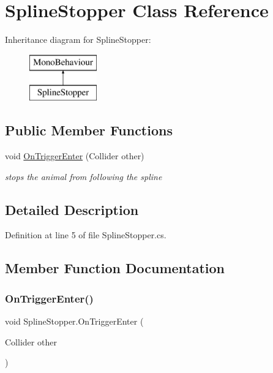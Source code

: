 \hypertarget{class_spline_stopper}{}\section{Spline\+Stopper Class Reference}
\label{class_spline_stopper}
Inheritance diagram for Spline\+Stopper\+:\begin{figure}[H]
\begin{center}
\leavevmode
\includegraphics[height=2.000000cm]{class_spline_stopper}
\end{center}
\end{figure}
\subsection*{Public Member Functions}
\begin{DoxyCompactItemize}
\item 
void \mbox{\hyperlink{class_spline_stopper_aa059cfb2f8f9bbf1fba969314fbbec49}{On\+Trigger\+Enter}} (Collider other)
\begin{DoxyCompactList}\small\item\em stops the animal from following the spline \end{DoxyCompactList}\end{DoxyCompactItemize}


\subsection{Detailed Description}


Definition at line 5 of file Spline\+Stopper.\+cs.



\subsection{Member Function Documentation}
\mbox{\label{class_spline_stopper_aa059cfb2f8f9bbf1fba969314fbbec49}} 
\subsubsection{\texorpdfstring{On\+Trigger\+Enter()}{OnTriggerEnter()}}
{\footnotesize\ttfamily void Spline\+Stopper.\+On\+Trigger\+Enter (\begin{DoxyParamCaption}\item[{Collider}]{other }\end{DoxyParamCaption})}



